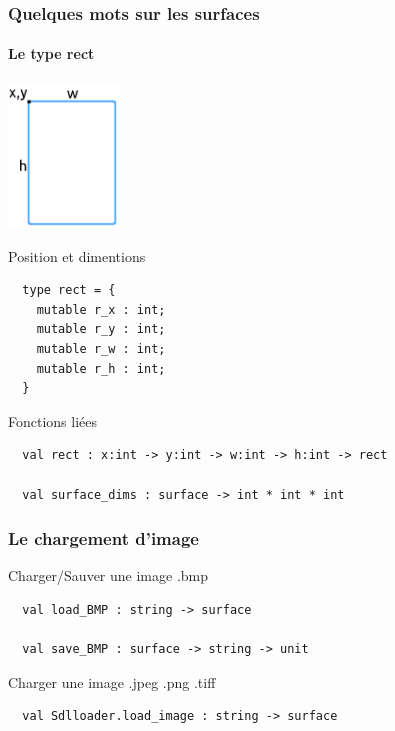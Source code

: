 \begin{frame}[fragile]
	\frametitle{Quelques mots sur les surfaces}
	\framesubtitle{Le type rect}
	\begin{center}\begin{minipage}{0.4\textwidth}
		\includegraphics[width=3cm]{pics/rect.png}
	\end{minipage}
	\begin{minipage}{0.4\textwidth}
		\begin{block}{Position et dimentions}
			\lstset{basicstyle=\footnotesize}
			\begin{lstlisting}
  type rect = {
    mutable r_x : int;
    mutable r_y : int;
    mutable r_w : int;
    mutable r_h : int;
  } 
			\end{lstlisting}
		\end{block}
	\end{minipage}\end{center}
	\begin{block}{Fonctions liées}
		\lstset{basicstyle=\footnotesize}
		\begin{lstlisting}
  val rect : x:int -> y:int -> w:int -> h:int -> rect

  val surface_dims : surface -> int * int * int
		\end{lstlisting}
	\end{block}
\end{frame}

\begin{frame}[fragile]
	\frametitle{Le chargement d'image}
	\begin{block}{Charger/Sauver une image .bmp}
		\begin{lstlisting}
  val load_BMP : string -> surface

  val save_BMP : surface -> string -> unit
		\end{lstlisting}
	\end{block}
	\begin{block}{Charger une image .jpeg .png .tiff}
		\begin{lstlisting}
  val Sdlloader.load_image : string -> surface

		\end{lstlisting}
	\end{block}
\end{frame}

